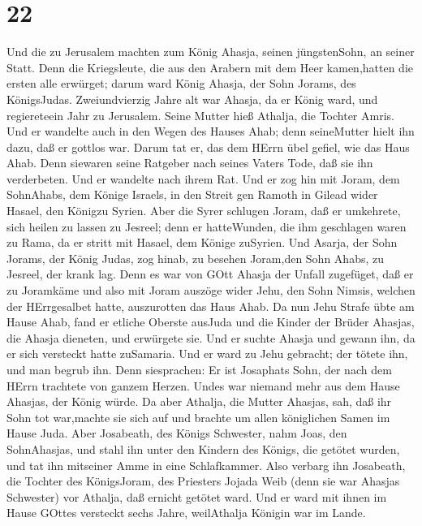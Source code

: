 \hypertarget{section-21}{%
\section{22}\label{section-21}}

 Und die zu Jerusalem machten zum König Ahasja, seinen
jüngstenSohn, an seiner Statt. Denn die Kriegsleute, die aus den Arabern
mit dem Heer kamen,hatten die ersten alle erwürget; darum ward König
Ahasja, der Sohn Jorams, des KönigsJudas.  Zweiundvierzig
Jahre alt war Ahasja, da er König ward, und regiereteein Jahr zu
Jerusalem. Seine Mutter hieß Athalja, die Tochter Amris. 
Und er wandelte auch in den Wegen des Hauses Ahab; denn seineMutter
hielt ihn dazu, daß er gottlos war.  Darum tat er, das dem
HErrn übel gefiel, wie das Haus Ahab. Denn siewaren seine Ratgeber nach
seines Vaters Tode, daß sie ihn verderbeten.  Und er
wandelte nach ihrem Rat. Und er zog hin mit Joram, dem SohnAhabs, dem
Könige Israels, in den Streit gen Ramoth in Gilead wider Hasael, den
Königzu Syrien. Aber die Syrer schlugen Joram,  daß er
umkehrete, sich heilen zu lassen zu Jesreel; denn er hatteWunden, die
ihm geschlagen waren zu Rama, da er stritt mit Hasael, dem Könige
zuSyrien. Und Asarja, der Sohn Jorams, der König Judas, zog hinab, zu
besehen Joram,den Sohn Ahabs, zu Jesreel, der krank lag. 
Denn es war von GOtt Ahasja der Unfall zugefüget, daß er zu Joramkäme
und also mit Joram auszöge wider Jehu, den Sohn Nimsis, welchen der
HErrgesalbet hatte, auszurotten das Haus Ahab.  Da nun Jehu
Strafe übte am Hause Ahab, fand er etliche Oberste ausJuda und die
Kinder der Brüder Ahasjas, die Ahasja dieneten, und erwürgete sie.
 Und er suchte Ahasja und gewann ihn, da er sich versteckt
hatte zuSamaria. Und er ward zu Jehu gebracht; der tötete ihn, und man
begrub ihn. Denn siesprachen: Er ist Josaphats Sohn, der nach dem HErrn
trachtete von ganzem Herzen. Undes war niemand mehr aus dem Hause
Ahasjas, der König würde.  Da aber Athalja, die Mutter
Ahasjas, sah, daß ihr Sohn tot war,machte sie sich auf und brachte um
allen königlichen Samen im Hause Juda.  Aber Josabeath, des
Königs Schwester, nahm Joas, den SohnAhasjas, und stahl ihn unter den
Kindern des Königs, die getötet wurden, und tat ihn mitseiner Amme in
eine Schlafkammer. Also verbarg ihn Josabeath, die Tochter des
KönigsJoram, des Priesters Jojada Weib (denn sie war Ahasjas Schwester)
vor Athalja, daß ernicht getötet ward.  Und er ward mit
ihnen im Hause GOttes versteckt sechs Jahre, weilAthalja Königin war im
Lande.

